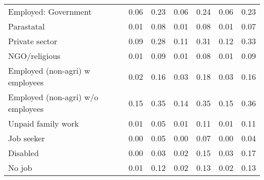 \begin{table}[htbp]
\begin{tabulary}{1\textwidth}{Lcccccc}
     Employed: Government & 0.06  & 0.23  & 0.06  & 0.24  & 0.06  & 0.23 \\
     Parastatal & 0.01  & 0.08  & 0.01  & 0.08  & 0.01  & 0.07 \\
     Private sector & 0.09  & 0.28  & 0.11  & 0.31  & 0.12  & 0.33 \\
     NGO/religious & 0.01  & 0.09  & 0.01  & 0.08  & 0.01  & 0.09 \\
     Employed (non-agri) w employees & 0.02  & 0.16  & 0.03  & 0.18  & 0.03  & 0.16 \\
     Employed (non-agri) w/o employees & 0.15  & 0.35  & 0.14  & 0.35  & 0.15  & 0.36 \\
     Unpaid family work & 0.01  & 0.05  & 0.01  & 0.11  & 0.01  & 0.11 \\
     
     Job seeker & 0.00  & 0.05  & 0.00  & 0.07  & 0.00  & 0.04 \\
    
     Disabled  & 0.00  & 0.03  & 0.02  & 0.15  & 0.03  & 0.17 \\
     No job & 0.01  & 0.12  & 0.02  & 0.13  & 0.02  & 0.13 \\
    \bottomrule
    \end{tabulary}%
        
  \label{tab:addlabel}%
\end{table}%
 

